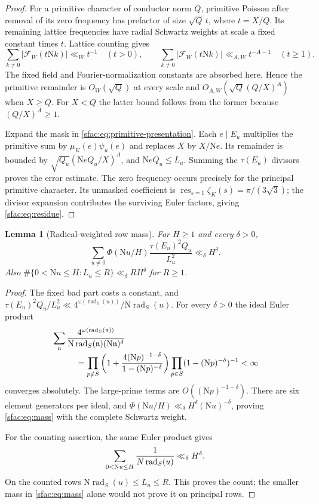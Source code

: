 \documentclass[11pt]{article}
\numberwithin{equation}{section}
\newtheorem{lemma}[theorem]{Lemma}
\theoremstyle{definition}
\theoremstyle{remark}
\newcommand{\N}{\mathrm N}
\begin{document}
\begin{proof}
For a primitive character of conductor norm $Q$, primitive Poisson after
removal of its zero frequency has prefactor of size $\sqrt Q\,t$,
where $t=X/Q$.  Its remaining lattice frequencies have radial Schwartz
weights at scale a fixed constant times $t$.  Lattice counting gives
\[
 \sum_{k\ne0}|\mathcal F_W(t\N k)|\ll_W t^{-1}\quad(t>0),
 \qquad
 \sum_{k\ne0}|\mathcal F_W(t\N k)|\ll_{A,W}t^{-A-1}
       \quad(t\ge1).
\]
The fixed field and Fourier-normalization constants are absorbed here.
Hence the primitive remainder is $O_W(\sqrt Q)$ at every scale and
$O_{A,W}(\sqrt Q(Q/X)^A)$ when $X\ge Q$.  For $X<Q$ the latter
bound follows from the former because $(Q/X)^A\ge1$.

Expand the mask in \eqref{sfac:eq:primitive-presentation}.  Each
$e\mid E_u$ multiplies the primitive sum by $\mu_K(e)\psi_u(e)$
and replaces $X$ by $X/\N e$.  Its remainder is bounded by
$\sqrt{Q_u}(\N e Q_u/X)^A$, and $\N e Q_u\le L_u$.
Summing the $\tau(E_u)$ divisors proves the error estimate.
The zero frequency occurs precisely for the principal primitive
character.  Its unmasked coefficient is
$\operatorname{res}_{s=1}\zeta_K(s)=\pi/(3\sqrt3)$; the divisor
expansion contributes the surviving Euler factors, giving
\eqref{sfac:eq:residue}.
\end{proof}

\begin{lemma}[Radical-weighted row mass]
\label{sfac:lem:mass}
For $H\ge1$ and every $\delta>0$,
\begin{equation}
 \sum_{u\ne0}\Phi(\N u/H)
       \frac{\tau(E_u)^2Q_u}{L_u^2}\ll_\delta H^\delta.
 \label{sfac:eq:mass}
\end{equation}
Also $\#\{0<\N u\le H:L_u\le R\}\ll_\delta RH^\delta$ for $R\ge1$.
\end{lemma}

\begin{proof}
The fixed bad part costs a constant, and
$\tau(E_u)^2Q_u/L_u^2\ll
4^{\omega(\operatorname{rad}_S(u))}/\N\operatorname{rad}_S(u)$.
For every $\delta>0$ the ideal Euler product
\begin{align}
 &\sum_{\mathfrak n}
 \frac{4^{\omega(\operatorname{rad}_S(\mathfrak n))}}
      {\N\operatorname{rad}_S(\mathfrak n)(\N\mathfrak n)^\delta}
 \notag\\[-2pt]
 &\hspace{1cm}=
 \prod_{p\notin S}
 \left(1+\frac{4(\N p)^{-1-\delta}}{1-(\N p)^{-\delta}}\right)
 \prod_{p\in S}(1-(\N p)^{-\delta})^{-1}
 <\infty\label{sfac:eq:Euler-mass}
\end{align}
converges absolutely.  The large-prime terms are $O((\N p)^{-1-\delta})$.
There are six element generators per ideal, and
$\Phi(\N u/H)\ll_\delta H^\delta(\N u)^{-\delta}$, proving
\eqref{sfac:eq:mass} with the complete Schwartz weight.

For the counting assertion, the same Euler product gives
\[
 \sum_{0<\N u\le H}\frac1{\\N\operatorname{rad}_S(u)}
       \ll_\delta H^\delta.
\]
On the counted rows $\N\operatorname{rad}_S(u)\le L_u\le R$.
This proves the count; the smaller mass in \eqref{sfac:eq:mass} alone
would not prove it on principal rows.
\end{proof}
\end{document}
